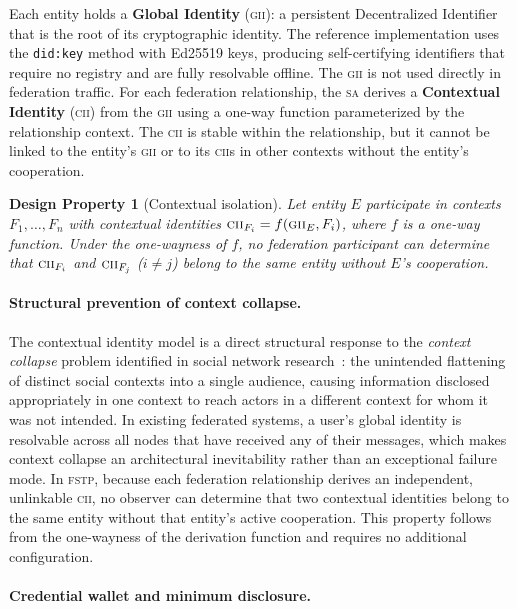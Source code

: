 \documentclass[12pt]{article}
\newtheorem{property}{Design Property}[section]
\newcommand{\SA}{\textsc{sa}}
\newcommand{\FSTP}{\textsc{fstp}}
\newcommand{\GII}{\textsc{gii}}
\newcommand{\CII}{\textsc{cii}}
\begin{document}
	Each entity holds a \textbf{Global Identity} (\GII{}): a persistent
	Decentralized Identifier~\cite{w3c2022did} that is the root of its
	cryptographic identity. The reference implementation uses the
	\texttt{did:key} method with Ed25519 keys, producing self-certifying
	identifiers that require no registry and are fully resolvable offline.
	The \GII{} is not used directly in federation
	traffic. For each federation relationship, the \SA{} derives a
	\textbf{Contextual Identity} (\CII{}) from the \GII{} using a
	one-way function parameterized by the relationship context. The \CII{}
	is stable within the relationship, but it cannot be linked to the
	entity's \GII{} or to its \CII{}s in other contexts without the
	entity's cooperation.
	
	\begin{property}[Contextual isolation]
		\label{prop:isolation}
		Let entity $E$ participate in contexts $F_1, \ldots, F_n$ with
		contextual identities $\CII_{F_i} = f(\GII_E, F_i)$, where $f$ is a
		one-way function. Under the one-wayness of $f$, no federation
		participant can determine that $\CII_{F_i}$ and $\CII_{F_j}$
		($i \neq j$) belong to the same entity without $E$'s cooperation.
	\end{property}
	
	\paragraph{Structural prevention of context collapse.}
	
	The contextual identity model is a direct structural response to the
	\emph{context collapse} problem identified in social network
	research~\cite{marwick2011tweet}: the unintended flattening of
	distinct social contexts into a single audience, causing information
	disclosed appropriately in one context to reach actors in a different
	context for whom it was not intended. In existing federated systems, a
	user's global identity is resolvable across all nodes that have
	received any of their messages, which makes context collapse an
	architectural inevitability rather than an exceptional failure mode.
	In \FSTP{}, because each federation relationship derives an
	independent, unlinkable \CII{}, no observer can determine that two
	contextual identities belong to the same entity without that entity's
	active cooperation. This property follows from the one-wayness of the
	derivation function and requires no additional configuration.
	
	\paragraph{Credential wallet and minimum disclosure.}
	
\end{document}
